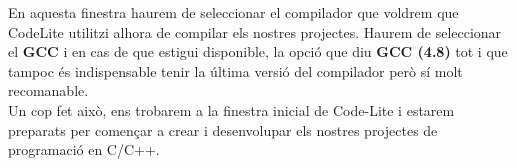 \documentclass[11pt]{article}
\begin{document}
\noindent En aquesta finestra haurem de seleccionar el compilador que voldrem que CodeLite utilitzi alhora de compilar els nostres projectes. Haurem de seleccionar el \textbf{GCC} i en cas de que estigui disponible, la opció que diu \textbf{GCC (4.8)} tot i que tampoc és indispensable tenir la última versió del compilador però sí molt recomanable. \\

\noindent Un cop fet això, ens trobarem a la finestra inicial de Code-Lite i estarem preparats per començar a crear i desenvolupar els nostres projectes de programació en C/C++.
\end{document}
